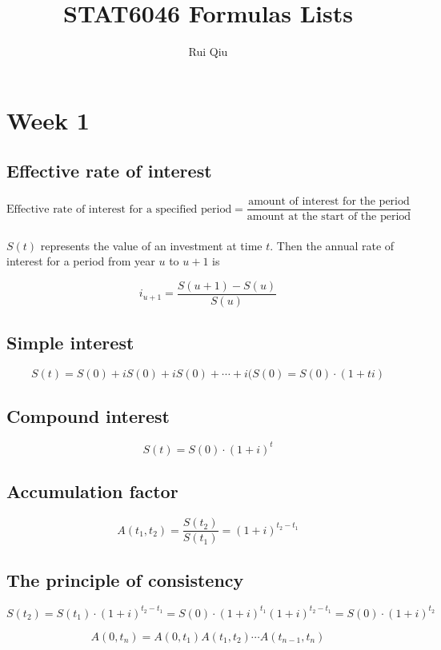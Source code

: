 \documentclass[a4paper, 11pt, twoside]{article}
\begin{document}
\title{STAT6046 Formulas Lists}
\author{Rui Qiu}

\maketitle

\section{Week 1}

\subsection{Effective rate of interest}

\[\text{Effective rate of interest for a specified period} = \frac{\text{amount of interest for the period}}{\text{amount at the start of the period}}\]\\

$S(t)$ represents the value of an investment at time $t.$ Then the annual rate of interest for a period from year $u$ to $u+1$ is

\[i_{u+1}=\frac{S(u+1)-S(u)}{S(u)}\]

\subsection{Simple interest}

\[S(t)=S(0)+iS(0)+iS(0)+\cdots +i(S(0)=S(0)\cdot(1+ti)\]

\subsection{Compound interest}

\[S(t)=S(0)\cdot (1+i)^t\]

\subsection{Accumulation factor}

\[A(t_1,t_2)=\frac{S(t_2)}{S(t_1)}=(1+i)^{t_2-t_1}\]

\subsection{The principle of consistency}

\[S(t_2)=S(t_1)\cdot(1+i)^{t_2-t_1}=S(0)\cdot(1+i)^{t_1}(1+i)^{t_2-t_1}=S(0)\cdot(1+i)^{t_2}\]

\[A(0,t_n)=A(0,t_1)A(t_1,t_2)\cdots A(t_{n-1},t_n)\]
\end{document}
